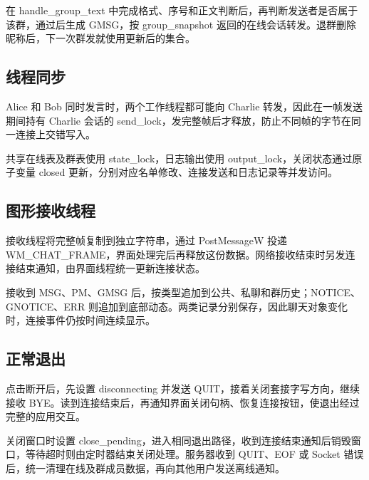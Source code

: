 \documentclass[UTF8,a4paper,10pt,fontset=fandol]{ctexart}
\begin{document}
在 handle\_group\_text 中完成格式、序号和正文判断后，再判断发送者是否属于该群，通过后生成 GMSG，按 group\_snapshot 返回的在线会话转发。退群删除昵称后，下一次群发就使用更新后的集合。

\medskip
\subsection{线程同步}
Alice 和 Bob 同时发言时，两个工作线程都可能向 Charlie 转发，因此在一帧发送期间持有 Charlie 会话的 send\_lock，发完整帧后才释放，防止不同帧的字节在同一连接上交错写入。

\medskip
共享在线表及群表使用 state\_lock，日志输出使用 output\_lock，关闭状态通过原子变量 closed 更新，分别对应名单修改、连接发送和日志记录等并发访问。

\subsection{图形接收线程}
接收线程将完整帧复制到独立字符串，通过 PostMessageW 投递 WM\_CHAT\_FRAME，界面处理完后再释放这份数据。网络接收结束时另发连接结束通知，由界面线程统一更新连接状态。

\medskip
接收到 MSG、PM、GMSG 后，按类型追加到公共、私聊和群历史；NOTICE、GNOTICE、ERR 则追加到底部动态。两类记录分别保存，因此聊天对象变化时，连接事件仍按时间连续显示。

\medskip
\subsection{正常退出}
点击断开后，先设置 disconnecting 并发送 QUIT，接着关闭套接字写方向，继续接收 BYE。读到连接结束后，再通知界面关闭句柄、恢复连接按钮，使退出经过完整的应用交互。

\medskip
关闭窗口时设置 close\_pending，进入相同退出路径，收到连接结束通知后销毁窗口，等待超时则由定时器结束关闭处理。服务器收到 QUIT、EOF 或 Socket 错误后，统一清理在线及群成员数据，再向其他用户发送离线通知。
\end{document}
